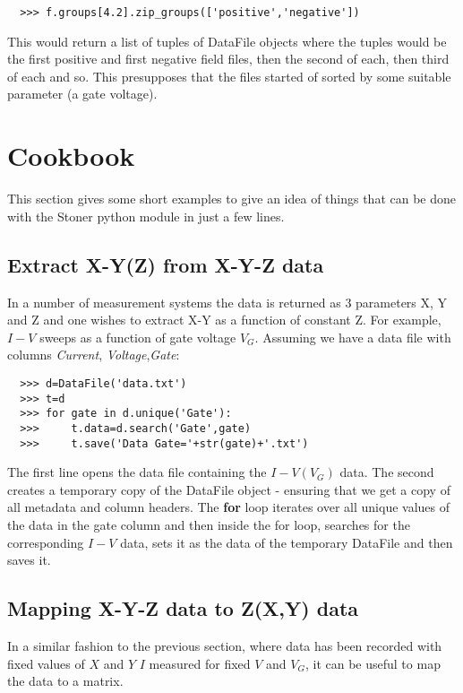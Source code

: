 \documentclass[a4paper,11pt]{scrartcl}
\begin{document}
\begin{verbatim}
  >>> f.groups[4.2].zip_groups(['positive','negative'])
\end{verbatim}

This would return a list of tuples of DataFile objects where the tuples would be the first positive and first negative field files, then the second of each, then third of each and so. This presupposes that the files started of sorted by some suitable parameter (\eg a gate voltage).



\section{Cookbook}

This section gives some short examples to give an idea of things that can be
done with the Stoner python module in just a few lines.

\subsection{Extract X-Y(Z) from X-Y-Z data}

In a number of measurement systems the data is returned as 3 parameters X, Y and
Z and one wishes to extract X-Y as a function of constant Z. For example, $I-V$
sweeps as a function of gate voltage $V_G$. Assuming we have a data file with
columns \textit{Current}, \textit{Voltage},\textit{Gate}:

\begin{verbatim}
  >>> d=DataFile('data.txt')
  >>> t=d
  >>> for gate in d.unique('Gate'):
  >>>     t.data=d.search('Gate',gate)
  >>>     t.save('Data Gate='+str(gate)+'.txt')
\end{verbatim}

The first line opens the data file containing the $I-V(V_G)$ data. The second
creates a temporary copy of the DataFile object - ensuring that we get a copy of
all metadata and column headers. The \textbf{for} loop iterates over all unique
values of the data in the gate column and then inside the for loop, searches for
the corresponding $I-V$ data, sets it as the data of the temporary DataFile and
then saves it.

\subsection{Mapping X-Y-Z data to Z(X,Y) data}

In a similar fashion to the previous section, where data has been recorded with
fixed values of $X$ and $Y$ \eg $I$ measured for fixed $V$ and $V_G$, it can be
useful to map the data to a matrix.
\end{document}
